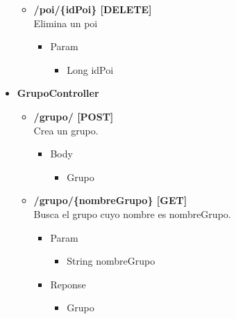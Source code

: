\begin{itemize}
\begin{itemize}
\item  \textbf{/poi/\{idPoi\} [DELETE]}\\
Elimina un poi
\begin{itemize}
\item Param
\begin{itemize}
\item Long idPoi
\end{itemize}

\end{itemize}
\end{itemize}



% 
\item \textbf{GrupoController}
\begin{itemize}
\item  \textbf{/grupo/ [POST]}\\
Crea un grupo.
\begin{itemize}
\item Body
\begin{itemize}
\item Grupo
\end{itemize}
\end{itemize}
\end{itemize}


\begin{itemize}
\item \textbf{ /grupo/\{nombreGrupo\} [GET]}\\
Busca el grupo cuyo nombre es nombreGrupo.
\begin{itemize}
\item Param
\begin{itemize}
\item String nombreGrupo
\end{itemize}
\item Reponse
\begin{itemize}
\item Grupo
\end{itemize}
\end{itemize}
\end{itemize}






\end{itemize}
